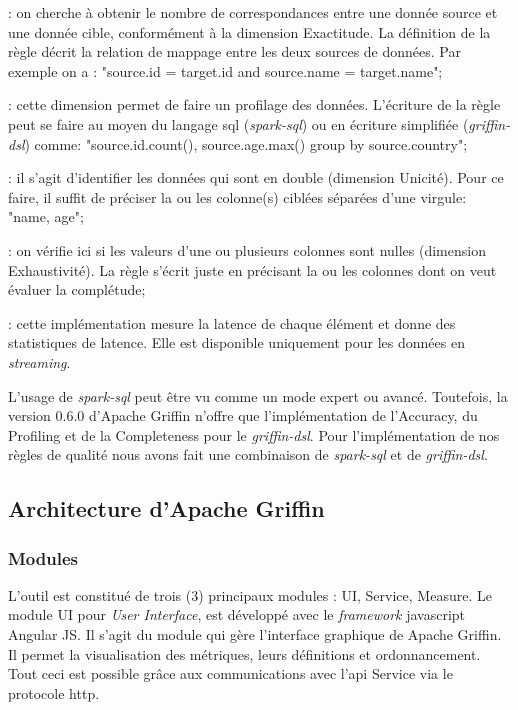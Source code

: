 \begin{description}[parsep=0cm,itemsep=0cm]
\item[Accuracy] : on cherche \`a obtenir le nombre de correspondances entre une donn\'ee source et une donn\'ee cible, conform\'ement \`a la dimension Exactitude. La d\'efinition de la règle décrit la relation de mappage entre les deux sources de données. Par exemple on a : "source.id = target.id and source.name = target.name";
\item[Profiling] : cette dimension permet de faire un profilage des donn\'ees. L'\'ecriture de la r\`egle peut se faire au moyen du langage \acrshort{sql} (\emph{spark-sql}) ou en \'ecriture simplifi\'ee (\emph{griffin-dsl}) comme: "source.id.count(), source.age.max() group by source.country";
\item[Distinctness] : il s'agit d'identifier les données qui sont en double (dimension Unicité). Pour ce faire, il suffit de pr\'eciser la ou les colonne(s) cibl\'ees s\'epar\'ees d'une virgule: "name, age";
\item[Completeness] : on vérifie ici si les valeurs d'une ou plusieurs colonnes sont nulles (dimension Exhaustivité). La r\`egle s'\'ecrit juste en pr\'ecisant la ou les colonnes dont on veut \'evaluer la compl\'etude;
\item[Timeliness] :  cette impl\'ementation mesure la latence de chaque élément et donne des statistiques de latence. Elle est disponible uniquement pour les donn\'ees en \textit{streaming}.
\end{description}
L'usage de \emph{spark-sql} peut \^etre vu comme un mode expert ou avanc\'e. Toutefois, la version 0.6.0 d'Apache Griffin n'offre que l'impl\'ementation de l'Accuracy, du Profiling et de la Completeness pour le \emph{griffin-dsl}. Pour l'impl\'ementation de nos r\`egles de qualit\'e nous avons fait une combinaison de \emph{spark-sql} et de \emph{griffin-dsl}.

\subsection{Architecture d'Apache Griffin}
\subsubsection{\textbf{Modules}}
L'outil est constitu\'e de trois (3) principaux modules : UI, Service, Measure. Le module UI pour \textit{User Interface}, est d\'evelopp\'e avec le \textit{framework} javascript Angular JS. Il s'agit du module qui g\`ere l'interface graphique de Apache Griffin. Il permet la visualisation des m\'etriques, leurs d\'efinitions et ordonnancement. Tout ceci est possible gr\^ace aux communications avec l'\acrshort{api} Service via le protocole \acrfull{http}. 
 
